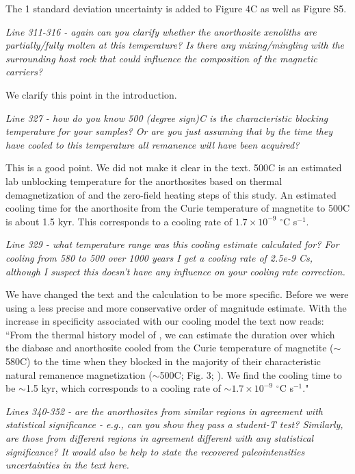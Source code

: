 \documentclass[11pt, letterpaper]{article}
\begin{document}
\begin{flushleft}
The 1 standard deviation uncertainty is added to Figure 4C as well as Figure S5.

\textit{Line 311-316 - again can you clarify whether the anorthosite xenoliths are partially/fully molten at this temperature? Is there any mixing/mingling with the surrounding host rock that could influence the composition of the magnetic carriers?}

We clarify this point in the introduction.  

\textit{Line 327 - how do you know 500 (degree sign)C is the characteristic blocking temperature for your samples? Or are you just assuming that by the time they have cooled to this temperature all remanence will have been acquired?}

This is a good point. We did not make it clear in the text. 500\textdegree C is an estimated lab unblocking temperature for the anorthosites based on thermal demagnetization of \cite{Zhang2021b} and the zero-field heating steps of this study. An estimated cooling time for the anorthosite from the Curie temperature of magnetite to 500\textdegree C is about 1.5 kyr. This corresponds to a cooling rate of $1.7\times10^{-9}$ $^\circ$C s$^{-1}$. 

\textit{Line 329 - what temperature range was this cooling estimate calculated for? For cooling from 580 to 500 over 1000 years I get a cooling rate of 2.5e-9 C\/s, although I suspect this doesn't have any influence on your cooling rate correction.}

We have changed the text and the calculation to be more specific. Before we were using a less precise and more conservative order of magnitude estimate. With the increase in specificity associated with our cooling model the text now reads: ``From the thermal history model of \cite{Zhang2021b}, we can estimate the duration over which the diabase and anorthosite cooled from the Curie temperature of magnetite ($\sim$580\textdegree C) to the time when they blocked in the majority of their characteristic natural remanence magnetization ($\sim$500\textdegree  C; Fig. 3; \citealp{Zhang2021b}). We find the cooling time to be $\sim$1.5 kyr, which corresponds to a cooling rate of $\sim1.7\times10^{-9}$ $^\circ$C s$^{-1}$."

\textit{Lines 340-352 - are the anorthosites from similar regions in agreement with statistical significance - e.g., can you show they pass a student-T test? Similarly, are those from different regions in agreement\/ different with any statistical significance? It would also be help to state the recovered paleointensities\/ uncertainties in the text here.}


\end{flushleft}
\end{document}
